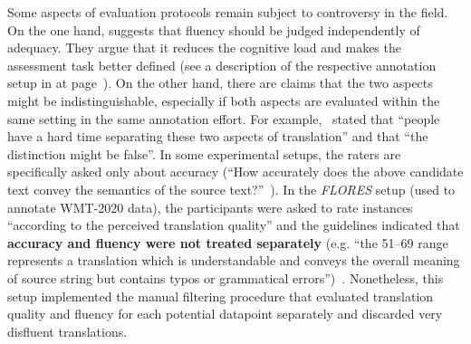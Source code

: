 Some aspects of evaluation protocols remain subject to controversy in the field. On the one hand, \citet{Graham2013, Graham2015} suggests that fluency should be judged independently of adequacy. 
They argue that it reduces the cognitive load and makes the assessment task better defined (see a description of the respective annotation setup in \citet{Daems2013} at page~\pageref{pg:daems_two-stage_errorann}). %
On the other hand, there are claims that the two aspects might be indistinguishable, especially if both aspects are evaluated within the same setting in the same annotation effort. For example,~\citet[p.140]{CallisonBurch2007} stated that ``people have a hard time separating these two aspects of translation'' and that ``the distinction might be false''.
In some experimental setups, the raters are specifically asked only about accuracy (``How accurately does the above candidate text convey the semantics of the source text?''~\cite{Hassan2018}). 
In the \textit{FLORES} setup (used to annotate WMT-2020 data), the participants were asked to rate instances ``according to the perceived translation quality'' and the guidelines indicated that \textbf{accuracy and fluency were not treated separately} (e.g. ``the 51--69 range represents a translation which is understandable and conveys the overall meaning of source string but contains typos or grammatical errors'')~\cite[p.6109]{Guzman2019}. Nonetheless, this setup implemented the manual filtering procedure that evaluated translation quality and fluency for each potential datapoint separately and discarded very disfluent translations. 
